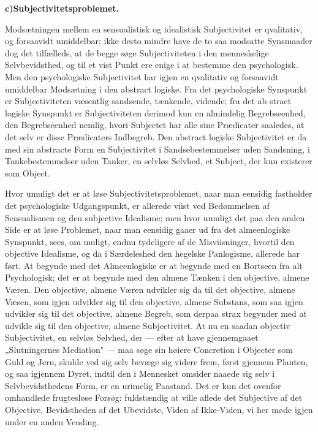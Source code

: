 \documentclass[12pt]{book}
\newcommand{\opage}[1]{\marginnote{\footnotesize\textit{[#1]}}}
\begin{document}
\begin{center}
{\bfseries c)\quad Subjectivitetsproblemet.}
\end{center}

Modsætningen mellem en sensualistisk og idealistisk Subjectivitet er qvalitativ,
og forsaavidt umiddelbar; ikke desto mindre have de to saa modsatte Synsmaader
dog det tilfælleds, at de begge søge Subjectiviteten i den menneskelige
Selvbevidsthed, og til et vist Punkt ere enige i at bestemme den psychologisk.
Men den psychologiske Subjectivitet har igjen en qvalitativ og forsaavidt
umiddelbar Modsætning i den abstract logiske. Fra det psychologiske Synspunkt er
Subjectiviteten væsentlig sandsende, tænkende, vidende; fra det ab%
\opage{36} stract logiske Synspunkt er Subjectiviteten derimod kun en almindelig
Begrebseenhed, den Begrebseenhed nemlig, hvori Subjectet har alle sine
Prædicater saaledes, at det selv er disse Prædicaters Indbegreb. Den abstract
logiske Subjectivitet er da med sin abstracte Form en Subjectivitet i
Sandsebestemmelser uden Sandsning, i Tankebestemmelser uden Tanker, en selvløs
Selvhed, et Subject, der kun existerer som Object.

Hvor umuligt det er at løse Subjectivitetsproblemet, naar man eensidig
fastholder det psychologiske Udgangspunkt, er allerede viist ved Bedømmelsen af
Sensualismen og den subjective Idealisme; men hvor umuligt det paa den anden
Side er at løse Problemet, naar man eensidig gaaer ud fra det almeenlogiske
Synspunkt, sees, om muligt, endnu tydeligere af de Misviisninger, hvortil den
objective Idealisme, og da i Særdeleshed den hegelske Panlogisme, allerede har
ført. At begynde med det Almeenlogiske er at begynde med en Bortseen fra alt
Psychologisk; det er at begynde med den almene Tænken i den objective, almene
Væren. Den objective, almene Væren udvikler sig da til det objective, almene
Væsen, som igjen udvikler sig til den objective, almene Substans, som saa igjen
udvikler sig til det objective, almene Begreb, som derpaa strax begynder med at
udvikle sig til den objective, almene Subjectivitet. At nu en saadan objectiv
Subjectivitet, en selvløs Selvhed, der --- efter at have gjennemgaaet
„Slutningernes Mediation" --- maa søge sin høiere Concretion i Objecter som Guld
og Jern, skulde ved sig selv bevæge sig videre frem, først gjennem Planten, og
saa igjennem Dyret, indtil den i Mennesket omsider naaede sig selv i
Selvbevidsthedens Form, er en urimelig Paastand. Det er kun det ovenfor
omhandlede frugtesløse Forsøg: fuldstændig at ville aflede det Subjective af det
Objective, Bevidstheden af det Ubevidste, Viden af Ikke-Viden, vi her møde igjen
under en anden Vending.
\end{document}
